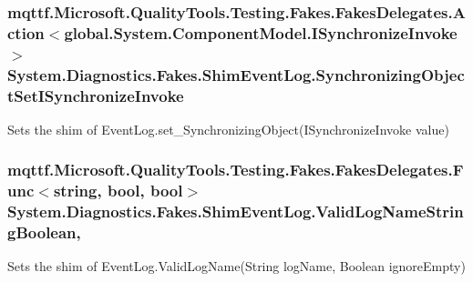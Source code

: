 \hypertarget{class_system_1_1_diagnostics_1_1_fakes_1_1_shim_event_log_a958c348387c001ae4e95bd75e72f6e9a}{
\subsubsection[{Synchronizing\-Object\-Set\-I\-Synchronize\-Invoke}]{\setlength{\rightskip}{0pt plus 5cm}mqttf.\-Microsoft.\-Quality\-Tools.\-Testing.\-Fakes.\-Fakes\-Delegates.\-Action$<$global.\-System.\-Component\-Model.\-I\-Synchronize\-Invoke$>$ System.\-Diagnostics.\-Fakes.\-Shim\-Event\-Log.\-Synchronizing\-Object\-Set\-I\-Synchronize\-Invoke\hspace{0.3cm}{\ttfamily [set]}}}\label{class_system_1_1_diagnostics_1_1_fakes_1_1_shim_event_log_a958c348387c001ae4e95bd75e72f6e9a}


Sets the shim of Event\-Log.\-set\-\_\-\-Synchronizing\-Object(\-I\-Synchronize\-Invoke value)

\hypertarget{class_system_1_1_diagnostics_1_1_fakes_1_1_shim_event_log_a83049c126db726109948d2b0327c7c57}{
\subsubsection[{Valid\-Log\-Name\-String\-Boolean}]{\setlength{\rightskip}{0pt plus 5cm}mqttf.\-Microsoft.\-Quality\-Tools.\-Testing.\-Fakes.\-Fakes\-Delegates.\-Func$<$string, bool, bool$>$ System.\-Diagnostics.\-Fakes.\-Shim\-Event\-Log.\-Valid\-Log\-Name\-String\-Boolean\hspace{0.3cm}{\ttfamily [static]}, {\ttfamily [set]}}}\label{class_system_1_1_diagnostics_1_1_fakes_1_1_shim_event_log_a83049c126db726109948d2b0327c7c57}


Sets the shim of Event\-Log.\-Valid\-Log\-Name(\-String log\-Name, Boolean ignore\-Empty)

